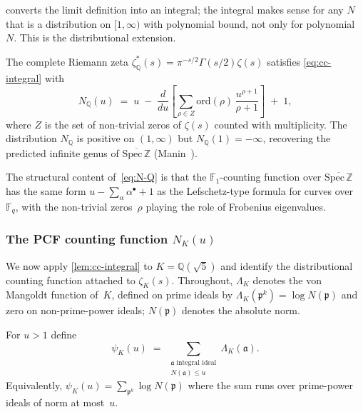  converts the limit definition into an
integral; the integral makes sense for any $N$ that is a
distribution on $[1,\infty)$ with polynomial bound, not only for
polynomial~$N$.  This is the distributional extension.

\begin{theorem}\label{thm:cc-zeta-Q}
The complete Riemann zeta
$\zeta_\mathbb{Q}^*(s) = \pi^{-s/2}\Gamma(s/2)\zeta(s)$ satisfies
\eqref{eq:cc-integral} with
\begin{equation}\label{eq:N-Q}
  N_\mathbb{Q}(u) \;=\; u
  \;-\; \frac{d}{du}\!\left[\sum_{\rho\in Z}
  \mathrm{ord}(\rho)\,\frac{u^{\rho+1}}{\rho+1}\right]
  \;+\; 1,
\end{equation}
where $Z$ is the set of non-trivial zeros of $\zeta(s)$ counted
with multiplicity.  The distribution $N_\mathbb{Q}$ is positive on
$(1,\infty)$ but $N_\mathbb{Q}(1) = -\infty$, recovering the
predicted infinite genus of $\overline{\mathrm{Spec}\,\mathbb{Z}}$
\textup{(}Manin~\cite{manin95}\textup{)}.
\end{theorem}

The structural content of~\eqref{eq:N-Q} is that the
$\mathbb{F}_1$-counting function over
$\overline{\mathrm{Spec}\,\mathbb{Z}}$ has the same form
$u - \sum_\alpha\alpha^{\bullet} + 1$ as the Lefschetz-type formula
for curves over $\mathbb{F}_q$, with the non-trivial zeros~$\rho$
playing the role of Frobenius eigenvalues.

\subsubsection{The PCF counting function $N_K(u)$}
\label{ssec:pcf-counting}

We now apply \cref{lem:cc-integral} to $K=\mathbb{Q}(\sqrt{5})$ and
identify the distributional counting function attached to
$\zeta_K(s)$.  Throughout, $\Lambda_K$ denotes the von Mangoldt
function of~$K$, defined on prime ideals by
$\Lambda_K(\mathfrak{p}^k) = \log N(\mathfrak{p})$ and zero on
non-prime-power ideals; $N(\mathfrak{p})$ denotes the absolute
norm.

\begin{definition}\label{def:chebyshev-K}
For $u>1$ define
\begin{equation}\label{eq:chebyshev-K}
  \psi_K(u) \;=\; \sum_{\substack{\mathfrak{a}\;\text{integral ideal}\\ N(\mathfrak{a})\le u}}
  \Lambda_K(\mathfrak{a}).
\end{equation}
Equivalently, $\psi_K(u) = \sum_{\mathfrak{p}^k}\log N(\mathfrak{p})$
where the sum runs over prime-power ideals of norm at most~$u$.
\end{definition}

